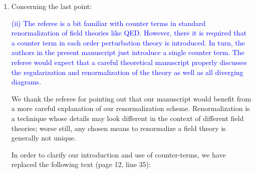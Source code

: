 \documentclass[preprint]{revtex4-1}
\newcommand{\1}{\mathds{1}}
\newcommand{\blue}[1]{\textcolor{blue}{#1}}
\begin{document}
\begin{enumerate}
\item Concerning the last point:

  \blue{(ii) The referee is a bit familiar with counter terms in
    standard renormalization of field theories like QED. However,
    there it is required that a counter term in each order
    perturbation theory is introduced. In turn, the authors in the
    present manuscript just introduce a single counter term. The
    referee would expect that a careful theoretical manuscript
    properly discusses the regularization and renormalization of the
    theory as well as all diverging diagrams.}

  \label{pt:renormalization}

  We thank the referee for pointing out that our manuscript would
  benefit from a more careful explanation of our renormalization
  scheme.  Renormalization is a technique whose details may look
  different in the context of different field theories; worse still,
  any chosen means to renormalize a field theory is generally not
  unique.

  In order to clarify our introduction and use of counter-terms, we
  have replaced the following text (page 12, line 35):


\end{enumerate}
\end{document}
